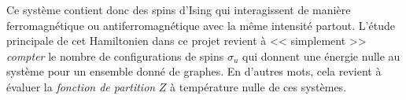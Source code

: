 Ce système contient donc des spins d'Ising qui interagissent de manière ferromagnétique ou antiferromagnétique avec la même intensité partout.
L'étude principale de cet Hamiltonien dans ce projet revient à << simplement >> \emph{compter} le nombre de configurations de spins $\sigma_u$ qui donnent une énergie nulle au système pour un ensemble donné de graphes.
En d'autres mots, cela revient à évaluer la \emph{fonction de partition} $Z$ à température nulle de ces systèmes.

